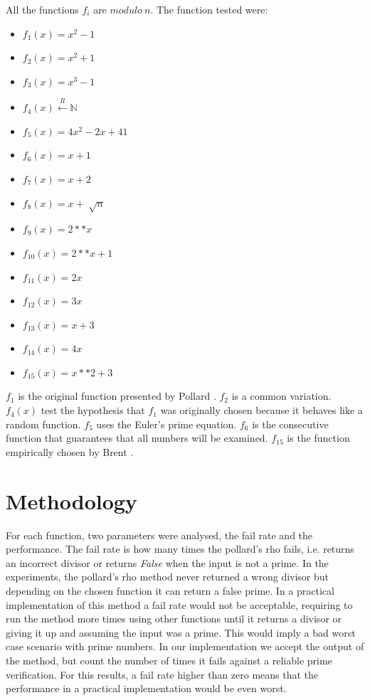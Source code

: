 \documentclass{article}
\begin{document}
All the functions $f_i$ are $modulo\ n$. The function tested were:\\
\begin{itemize}
  \item $f_1(x) = x^2-1$
  \item $f_2(x) = x^2+1$
  \item $f_3(x) = x^3-1$
  \item $f_4(x) \xleftarrow{R} \mathbb{N}$
  \item $f_5(x) = 4x^2 - 2x +41$
  \item $f_6(x) = x+1$
  \item $f_7(x) = x+2$
  \item $f_8(x) = x+\sqrt[]{n}$
  \item $f_9(x) = 2**x$
  \item $f_{10}(x) = 2**x+1$
  \item $f_{11}(x) = 2x$
  \item $f_{12}(x) = 3x$
  \item $f_{13}(x) = x+3$
  \item $f_{14}(x) = 4x$
  \item $f_{15}(x) = x**2+3$
\end{itemize}

$f_1$ is the original function presented by Pollard \citep{pollard1975monte}. $f_2$ is a common variation. $f_4(x)$ test the hypothesis that $f_1$ was originally chosen because it behaves like a random function. $f_5$ uses the Euler's prime equation. $f_6$ is the consecutive function that guarantees that all numbers will be examined. $f_{15}$ is the function empirically chosen by Brent \citep{brent1980improved}.

\section{Methodology}

For each function, two parameters were analysed, the fail rate and the performance. The fail rate is how many times the pollard's rho fails, i.e. returns an incorrect divisor or returns \textit{False} when the input is not a prime. In the experiments, the pollard's rho method never returned a wrong divisor but depending on the chosen function it can return a false prime. In a practical implementation of this method a fail rate would not be acceptable, requiring to run the method more times using other functions until it returns a divisor or giving it up and assuming the input was a prime. This would imply a bad worst case scenario with prime numbers. In our implementation we accept the output of the method, but count the number of times it fails against a reliable prime verification. For this results, a fail rate higher than zero means that the performance in a practical implementation would be even worst.\\
\end{document}
